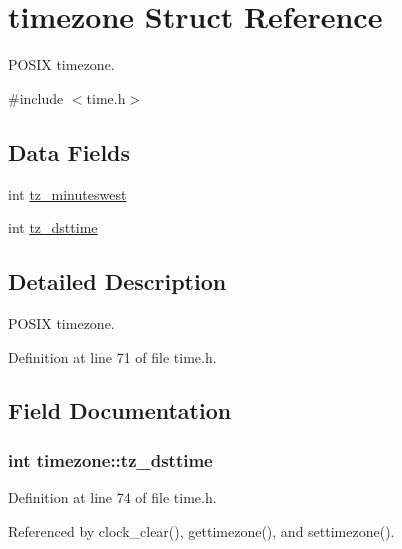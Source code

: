 \hypertarget{structtimezone}{}\section{timezone Struct Reference}
\label{structtimezone}


P\+O\+S\+IX timezone.  




{\ttfamily \#include $<$time.\+h$>$}

\subsection*{Data Fields}
\begin{DoxyCompactItemize}
\item 
int \hyperlink{structtimezone_a3042f7eff6e1b980728def76b1fa0eb7}{tz\+\_\+minuteswest}
\item 
int \hyperlink{structtimezone_a85259977aeb63b17e6ce94f19afdfd99}{tz\+\_\+dsttime}
\end{DoxyCompactItemize}


\subsection{Detailed Description}
P\+O\+S\+IX timezone. 

Definition at line 71 of file time.\+h.



\subsection{Field Documentation}
\subsubsection[{\texorpdfstring{tz\+\_\+dsttime}{tz_dsttime}}]{\setlength{\rightskip}{0pt plus 5cm}int timezone\+::tz\+\_\+dsttime}\hypertarget{structtimezone_a85259977aeb63b17e6ce94f19afdfd99}{}\label{structtimezone_a85259977aeb63b17e6ce94f19afdfd99}


Definition at line 74 of file time.\+h.



Referenced by clock\+\_\+clear(), gettimezone(), and settimezone().

